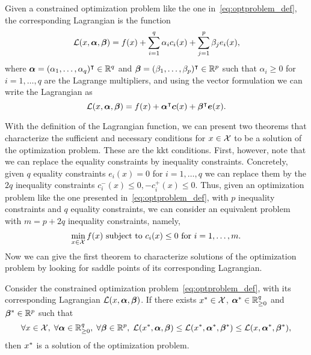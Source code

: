 \begin{definition}[Lagrangian]
    Given a constrained optimization problem like the one in~\eqref{eq:optproblem_def}, the corresponding Lagrangian is the function 
    \begin{equation}
        \label{eq:lagr_def}
        \lagr(x, \fv{\alpha}, \fv{\beta}) = f(x) + \sum_{i=1}^q \alpha_i c_i(x) + \sum_{j=1}^p \beta_j e_i(x) ,
    \end{equation}
    where $\bm{\alpha} = (\alpha_1, \ldots, \alpha_q)^\intercal \in \mathbb{R}^q$ and $\bm{\beta} = (\beta_1, \ldots, \beta_p)^\intercal \in \mathbb{R}^p$ such that $\alpha_i \geq 0$ for $i=1, \ldots, q$ are the Lagrange multipliers, and using the vector formulation we can write the Lagrangian as 
    \begin{equation}
        \label{eq:lagr_defvec}
        \lagr(x, \fv{\alpha}, \fv{\beta}) = f(x) + \fv{\alpha}^\intercal \fv{c}(x) + \fv{\beta}^\intercal \fv{e}(x) .
    \end{equation}
\end{definition}
With the definition of the Lagrangian function, we can present two theorems that characterize the sufficient and necessary conditions for $x \in \mathcal{X}$ to be a solution of the optimization problem. These are the \acrfull{kkt} conditions.
%
First, however, note that we can replace the equality constraints by inequality constraints. Concretely, given $q$ equality constraints $e_i(x)=0$ for $i=1, \ldots, q$ we can replace them by the $2q$ inequality constraints 
$c_i^-(x) \leq 0, -c_i^+(x) \leq 0$.
%
Thus, given an optimization problem like the one presented in~\eqref{eq:optproblem_def}, with $p$ inequality constraints and $q$ equality constraints, we can consider an equivalent problem with $m = p + 2q$ inequality constraints, namely,
\begin{equation}
    \nonumber
    \min_{x \in \mathcal{X}} f(x) \text{ subject to } c_i(x) \leq 0 \text{ for } i=1, \ldots, m .
\end{equation}
%
Now we can give the first theorem to characterize solutions of the optimization problem by looking for saddle points of its corresponding Lagrangian.
\begin{theorem}\label{th:kkt_saddlepoint}
    Consider the constrained optimization problem~\eqref{eq:optproblem_def}, with its corresponding Lagrangian $\mathcal{L}(x, \bm{\alpha}, \bm{\beta})$. If there exists ${x}^* \in \mathcal{X}$, ${\bm{\alpha}}^* \in \mathbb{R}_{\geq 0}^q$ and ${\bm{\beta}}^* \in \mathbb{R}^p$ such that 
    \begin{equation}
        \label{eq:saddle_point}
        \forall x \in \vecspace,\;  \forall \fv{\alpha} \in \reals_{\geq 0}^q,\; \forall \fv{\beta} \in \reals^p,\; \lagr(\opt{x}, \fv{\alpha}, \fv{\beta}) \leq \lagr(\opt{x}, \opt{\fv{\alpha}}, \opt{\fv{\beta}}) \leq \lagr(x, \opt{\fv{\alpha}}, \opt{\fv{\beta}}),
    \end{equation}
    then ${x}^*$ is a solution of the optimization problem.
\end{theorem}

